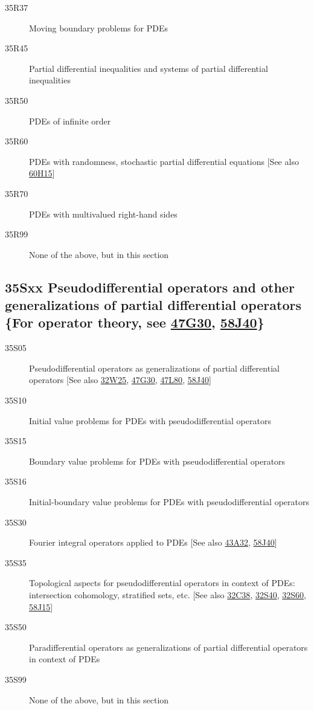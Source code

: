 \documentclass[letterpaper]{article}
\begin{document}
\begin{description}
\item [35R37]\label{35R37} Moving boundary problems for PDEs
\item [35R45]\label{35R45} Partial differential inequalities and systems of  partial differential inequalities
\item [35R50]\label{35R50} PDEs of infinite order
\item [35R60]\label{35R60} PDEs with randomness, stochastic partial differential equations [See also \hyperref[60H15]{60H15}]
\item [35R70]\label{35R70} PDEs with multivalued right-hand sides
\item [35R99]\label{35R99} None of the above, but in this section
\end{description}
\subsection*{35Sxx  Pseudodifferential operators and other generalizations of partial differential operators \{For operator theory, see \hyperref[47G30]{47G30}, \hyperref[58J40]{58J40}\} }\label{35Sxx}
\begin{description}  
\item [35S05]\label{35S05} Pseudodifferential operators as generalizations of partial differential operators [See also \hyperref[32W25]{32W25}, \hyperref[47G30]{47G30}, \hyperref[47L80]{47L80}, \hyperref[58J40]{58J40}]
\item [35S10]\label{35S10} Initial value problems for PDEs with pseudodifferential operators
\item [35S15]\label{35S15} Boundary value problems for PDEs with pseudodifferential operators
\item [35S16]\label{35S16} Initial-boundary value problems for PDEs with pseudodifferential operators
\item [35S30]\label{35S30} Fourier integral operators applied to PDEs  [See also \hyperref[43A32]{43A32}, \hyperref[58J40]{58J40}]
\item [35S35]\label{35S35} Topological aspects for pseudodifferential operators in context of PDEs: intersection cohomology, stratified sets, etc. [See also \hyperref[32C38]{32C38}, \hyperref[32S40]{32S40}, \hyperref[32S60]{32S60}, \hyperref[58J15]{58J15}]
\item [35S50]\label{35S50} Paradifferential operators as generalizations of partial differential operators in context of PDEs 
\item [35S99]\label{35S99} None of the above, but in this section
\end{description}
\end{document}
